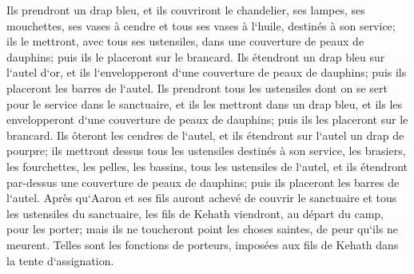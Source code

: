 \verse Ils prendront un drap bleu, et ils couvriront le chandelier, ses lampes, ses mouchettes, ses vases à cendre et tous ses vases à l`huile, destinés à son service; 
\verse ils le mettront, avec tous ses ustensiles, dans une couverture de peaux de dauphins; puis ils le placeront sur le brancard. 
\verse Ils étendront un drap bleu sur l`autel d`or, et ils l`envelopperont d`une couverture de peaux de dauphins; puis ils placeront les barres de l`autel. 
\verse Ils prendront tous les ustensiles dont on se sert pour le service dans le sanctuaire, et ils les mettront dans un drap bleu, et ils les envelopperont d`une couverture de peaux de dauphins; puis ils les placeront sur le brancard. 
\verse Ils ôteront les cendres de l`autel, et ils étendront sur l`autel un drap de pourpre; 
\verse ils mettront dessus tous les ustensiles destinés à son service, les brasiers, les fourchettes, les pelles, les bassins, tous les ustensiles de l`autel, et ils étendront par-dessus une couverture de peaux de dauphins; puis ils placeront les barres de l`autel. 
\verse Après qu`Aaron et ses fils auront achevé de couvrir le sanctuaire et tous les ustensiles du sanctuaire, les fils de Kehath viendront, au départ du camp, pour les porter; mais ils ne toucheront point les choses saintes, de peur qu`ils ne meurent. Telles sont les fonctions de porteurs, imposées aux fils de Kehath dans la tente d`assignation. 
